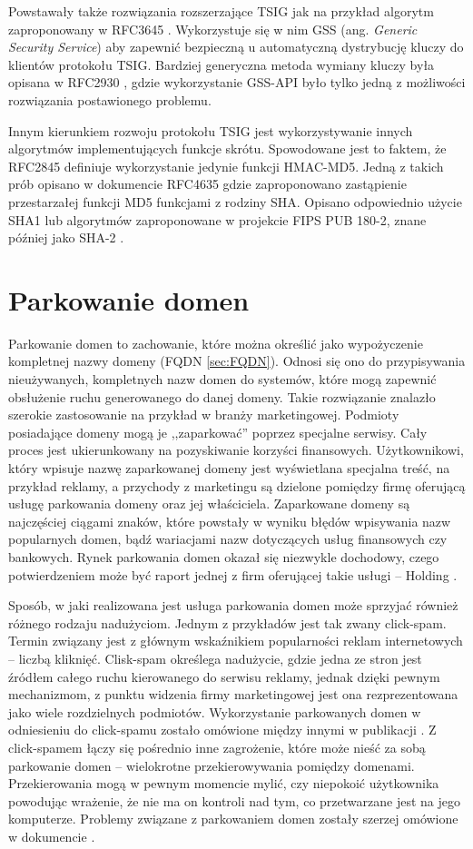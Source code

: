 Powstawały także rozwiązania rozszerzające TSIG jak na przykład algorytm zaproponowany w RFC3645 \cite{RFC3645}. Wykorzystuje się
w nim GSS \cite{RFC2743}(ang. \textit{Generic Security Service}) aby zapewnić bezpieczną u automatyczną dystrybucję kluczy do
klientów protokołu TSIG. Bardziej generyczna metoda wymiany kluczy była opisana w RFC2930 \cite{RFC2930}, gdzie wykorzystanie
GSS-API było tylko jedną z możliwości rozwiązania postawionego problemu.

Innym kierunkiem rozwoju protokołu TSIG jest wykorzystywanie innych algorytmów implementujących funkcje skrótu. Spowodowane
jest to faktem, że RFC2845 \cite{RFC2845} definiuje wykorzystanie jedynie funkcji HMAC-MD5. Jedną z takich prób opisano w
dokumencie RFC4635 \cite{RFC4635} gdzie zaproponowano zastąpienie przestarzałej funkcji MD5 funkcjami z rodziny SHA. Opisano
odpowiednio użycie SHA1 \cite{RFC3174} lub algorytmów zaproponowane w projekcie FIPS PUB 180-2, znane później jako SHA-2 \cite{RFC4634}.

\section{Parkowanie domen}
Parkowanie domen to zachowanie, które można określić jako wypożyczenie kompletnej nazwy domeny (FQDN \ref{sec:FQDN}).
Odnosi się ono do przypisywania nieużywanych, kompletnych nazw domen do systemów, które mogą zapewnić obsłużenie ruchu generowanego
do danej domeny. Takie rozwiązanie znalazło szerokie zastosowanie na przykład w branży marketingowej. Podmioty posiadające domeny mogą
je ,,zaparkować'' poprzez specjalne serwisy. Cały proces jest ukierunkowany na pozyskiwanie korzyści finansowych. Użytkownikowi,
który wpisuje nazwę zaparkowanej domeny jest wyświetlana specjalna treść, na przykład reklamy, a przychody z marketingu są dzielone
pomiędzy firmę oferującą usługę parkowania domeny oraz jej właściciela. Zaparkowane domeny są najczęściej ciągami znaków, które
powstały w wyniku błędów wpisywania nazw popularnych domen, bądź wariacjami nazw dotyczących usług finansowych czy bankowych.
Rynek parkowania domen okazał się niezwykle dochodowy, czego potwierdzeniem może być raport jednej z firm oferującej
takie usługi --  Holding \cite{sedo}.

Sposób, w jaki realizowana jest usługa parkowania domen może sprzyjać również różnego rodzaju nadużyciom. Jednym z przykładów jest tak
zwany click-spam. Termin związany jest z głównym wskaźnikiem popularności reklam internetowych -- liczbą kliknięć. Clisk-spam określega
nadużycie, gdzie jedna ze stron jest źródłem całego ruchu kierowanego do serwisu reklamy, jednak dzięki pewnym mechanizmom, z punktu
widzenia firmy marketingowej jest ona rezprezentowana jako wiele rozdzielnych podmiotów. Wykorzystanie parkowanych domen w odniesieniu
do click-spamu zostało omówione między innymi w publikacji \cite{measuring-and-fingerprinting-click-spam-in-ad-networks}.
Z click-spamem łączy się pośrednio inne zagrożenie, które może nieść za sobą parkowanie domen -- wielokrotne przekierowywania
pomiędzy domenami. Przekierowania mogą w pewnym momencie mylić, czy niepokoić użytkownika powodując wrażenie, że nie ma on
kontroli nad tym, co przetwarzane jest na jego komputerze. Problemy związane z parkowaniem domen zostały szerzej omówione w
dokumencie \cite{domain_parking}.
